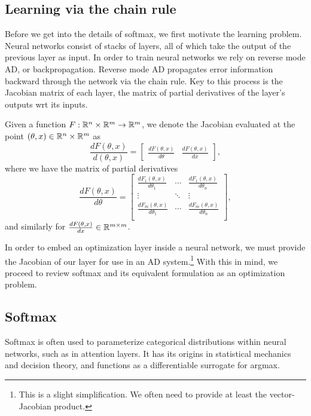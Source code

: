 \documentclass[11pt]{article}
\begin{document}
\subsection{Learning via the chain rule}
Before we get into the details of softmax, we first motivate the learning problem.
Neural networks consist of stacks of layers,
all of which take the output of the previous layer as input.
In order to train neural networks we rely on reverse mode AD, or backpropagation.
Reverse mode AD propagates error information backward through the network via the chain rule.
Key to this process is the Jacobian matrix of each layer, the matrix of partial derivatives
of the layer's outputs wrt its inputs.

Given a function $F:\mathbb{R}^n\times\mathbb{R}^m\to\mathbb{R}^m$, we denote the Jacobian evaluated at
the point $(\theta,x)\in\mathbb{R}^n\times\mathbb{R}^m$ as
\begin{equation*}
\frac{dF(\theta,x)}{d(\theta,x)} = \begin{bmatrix}
    \frac{dF(\theta,x)}{d\theta} &\frac{dF(\theta,x)}{dx} 
\end{bmatrix},
\end{equation*}
where we have the matrix of partial derivatives
\begin{equation*}
\frac{dF(\theta,x)}{d\theta} = \begin{bmatrix}
    \frac{dF_1(\theta,x)}{d\theta_1} & \cdots & \frac{dF_1(\theta,x)}{d\theta_n} \\
    \vdots & \ddots & \vdots \\
    \frac{dF_m(\theta,x)}{d\theta_1} & \cdots & \frac{dF_m(\theta,x)}{d\theta_n} \\
\end{bmatrix},
\end{equation*}
and similarly for $\frac{dF(\theta,x)}{dx}\in\mathbb{R}^{m\times m}$.

In order to embed an optimization layer inside a neural network,
we must provide the Jacobian of our layer for use in an AD system.\footnote{
This is a slight simplification. We often need to provide
at least the vector-Jacobian product.
}
With this in mind, we proceed to review softmax and its equivalent formulation
as an optimization problem.

\subsection{Softmax}
Softmax is often used to parameterize categorical distributions within neural networks,
such as in attention layers.
It has its origins in statistical mechanics and decision theory, and functions
as a differentiable surrogate for argmax.
\end{document}
